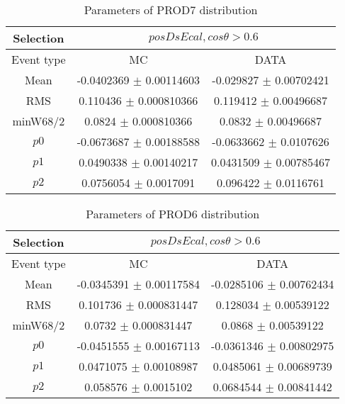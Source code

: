 \documentclass[a4paper,12pt]{article}
\begin{document}
\begin{table}[htbp]
\begin{center}
\begin{tabular}{|c|c|c|}
        \hline
        Selection & \multicolumn{2}{|c|}{$posDsEcal, cos\theta>0.6$}  \\ \hline
        Event type & MC & DATA \\ 
        \hline
        Mean & -0.0402369 $\pm$ 0.00114603 & -0.029827 $\pm$ 0.00702421 \\ 
        \hline 
        RMS & 0.110436 $\pm$ 0.000810366 & 0.119412 $\pm$ 0.00496687 \\ 
        \hline 
        minW68/2 & 0.0824 $\pm$ 0.000810366 & 0.0832 $\pm$ 0.00496687 \\ 
        \hline 
        $p0$ & -0.0673687 $\pm$ 0.00188588 & -0.0633662 $\pm$ 0.0107626 \\ 
        \hline 
        $p1$ & 0.0490338 $\pm$ 0.00140217 & 0.0431509 $\pm$ 0.00785467 \\ 
        \hline 
        $p2$ & 0.0756054 $\pm$ 0.0017091 & 0.096422 $\pm$ 0.0116761 \\ 
        \hline 
\end{tabular}
\caption{Parameters of PROD7 distribution } \vspace{0.2in}
\label{xxx}
\end{center}
\end{table}
\begin{table}[htbp]
\begin{center}
\begin{tabular}{|c|c|c|}
        \hline
        Selection & \multicolumn{2}{|c|}{$posDsEcal, cos\theta>0.6$}  \\ \hline
        Event type & MC & DATA \\ 
        \hline
        Mean & -0.0345391 $\pm$ 0.00117584 & -0.0285106 $\pm$ 0.00762434 \\ 
        \hline 
        RMS & 0.101736 $\pm$ 0.000831447 & 0.128034 $\pm$ 0.00539122 \\ 
        \hline 
        minW68/2 & 0.0732 $\pm$ 0.000831447 & 0.0868 $\pm$ 0.00539122 \\ 
        \hline 
        $p0$ & -0.0451555 $\pm$ 0.00167113 & -0.0361346 $\pm$ 0.00802975 \\ 
        \hline 
        $p1$ & 0.0471075 $\pm$ 0.00108987 & 0.0485061 $\pm$ 0.00689739 \\ 
        \hline 
        $p2$ & 0.058576 $\pm$ 0.0015102 & 0.0684544 $\pm$ 0.00841442 \\ 
        \hline 
\end{tabular}
\caption{Parameters of PROD6 distribution } \vspace{0.2in}
\label{xxx}
\end{center}
\end{table}
\end{document}

